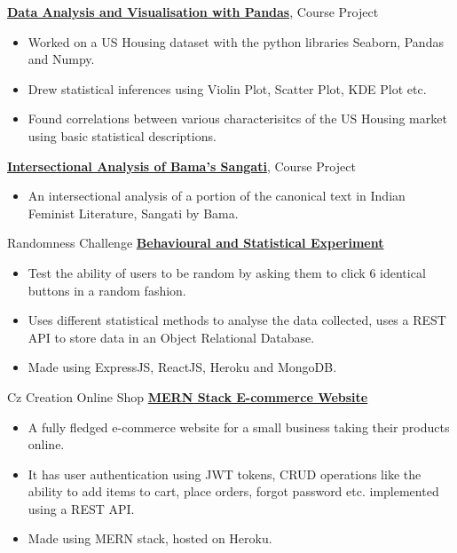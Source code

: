 {}
{\href{https://drive.google.com/file/d/1EF9wtUCJqQINYWiY4uFL4mmktJBL6r1b/view?usp=sharing}{\textbf{Data Analysis and Visualisation with Pandas}}, Course Project}
{
    \begin{itemize}
        \item Worked on a US Housing dataset with the python libraries Seaborn, Pandas and Numpy.
        \item Drew statistical inferences using Violin Plot, Scatter Plot, KDE Plot etc.
        \item Found correlations between various characterisitcs of the US Housing market using basic statistical descriptions.
    \end{itemize}
}
%
%
{}
{\href{https://drive.google.com/file/d/1O1eKscjk0mdHNJaD74NXsMMct6Itq04K/view?usp=sharing}{\textbf{Intersectional Analysis of Bama's Sangati}}, Course Project}
{
    \begin{itemize}
        \item An intersectional analysis of a portion of the canonical text in Indian Feminist Literature, Sangati by Bama.
    \end{itemize}
}
%
%
{Randomness Challenge}
{\href{https://randomnesschallenge-71zq.onrender.com/}{\textbf{Behavioural and Statistical Experiment}}}
{
    \begin{itemize}
        \item Test the ability of users to be random by asking them to click 6 identical buttons in a random fashion.
        \item Uses different statistical methods to analyse the data collected, uses a REST API to store data in an Object Relational Database.
        \item Made using ExpressJS, ReactJS, Heroku and MongoDB.
    \end{itemize}
}
%
%
{Cz Creation Online Shop}
{\href{https://czcreation.onrender.com/}{\textbf{MERN Stack E-commerce Website}}}
{
    \begin{itemize}
        \item A fully fledged e-commerce website for a small business taking their products online.
        \item It has user authentication using JWT tokens, CRUD operations like the ability to add items to cart, place orders, forgot password etc. implemented using a REST API.
        \item Made using MERN stack, hosted on Heroku.
    \end{itemize}
}
